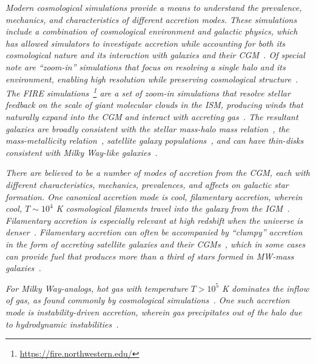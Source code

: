 \documentclass[fleqn,usenatbib]{mnras}
\begin{document}
\textit{
Modern cosmological simulations provide a means to understand the prevalence, mechanics, and characteristics of different accretion modes.
These simulations include a combination of cosmological environment and galactic physics, which has allowed simulators to investigate accretion while accounting for both its cosmological nature and its interaction with galaxies and their CGM~\citep[e.g.][Trapp et al,. in prep.]{Oppenheimer2010, Stewart2011, Fernandez2012, Ford2014, Angles-Alcazar2017, Hafen2019, Hafen2020, Ho2019, Rottgers2020}.
Of special note are ``zoom-in'' simulations that focus on resolving a single halo and its environment, enabling high resolution while preserving cosmological structure~\citep[e.g.][]{Katz1993, Hopkins2014, Hopkins2018, Wang2015, Agertz2020}.
The FIRE simulations~\citep{Hopkins2014, Hopkins2017}\footnote{\url{https://fire.northwestern.edu/}} are a set of zoom-in simulations that resolve stellar feedback on the scale of giant molecular clouds in the ISM, producing winds that naturally expand into the CGM and interact with accreting gas~\citep{Muratov2015,Muratov2016, Hafen2019, Hafen2020}.
The resultant galaxies are broadly consistent with the stellar mass-halo mass relation~\cite{Hopkins2017}, the mass-metallicity relation~\citep{Ma2015}, satellite galaxy populations~\cite{Wetzel2016,Garrison-Kimmel2019a}, and can have thin-disks consistent with Milky Way-like galaxies~\cite{Garrison-Kimmel2018, El-Badry2018}.
}

\textit{
There are believed to be a number of modes of accretion from the CGM, each with different characteristics, mechanics, prevalences, and affects on galactic star formation.
One canonical accretion mode is cool, filamentary accretion, wherein cool, $T \sim 10^4$ K cosmological filaments travel into the galaxy  from the IGM~\cite[e.g.][]{Keres2005, Dekel2006, Keres2009, Martin2019a}.
Filamentary accretion is especially relevant at high redshift when the universe is denser~\citep[e.g.][]{Keres2009a, Stern2019, Huscher2020}.
Filamentary accretion can often be accompanied by ``clumpy'' accretion in the form of accreting satellite galaxies and their CGMs~\citep[e.g.][]{Hafen2019, Hafen2020}, which in some cases can provide fuel that produces more than a third of stars formed in MW-mass galaxies~\citep{Angles-Alcazar2017}.
}

\textit{
For Milky Way-analogs, hot gas with temperature $T>10^5$ K dominates the inflow of gas, as found commonly by cosmological simulations~\citep{Faucher-Giguere2011a, VandeVoort2011, VandeVoort2012a, Joung2012, Murante2012, Nelson2013}.
One such accretion mode is instability-driven accretion, wherein gas precipitates out of the halo due to hydrodynamic instabilities~\citep[e.g.][]{Maller2004, Mccourt2012, Voit2015, Armillotta2016, Gronke2019a, Esmerian2020, Voit2021}.
}
\end{document}
